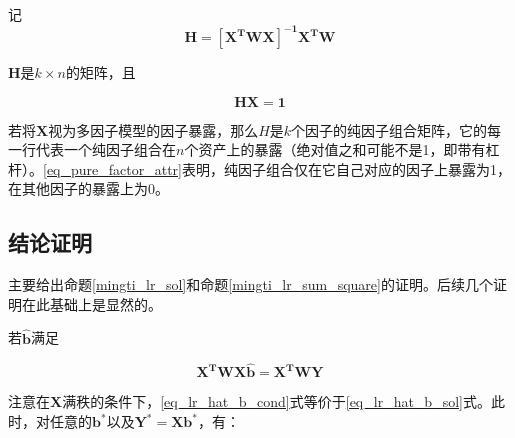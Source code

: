 \begin{mingti}
    记
    \begin{equation}
        \bm{H} = \bm{[X^TWX]^{-1}X^TW}
    \end{equation}

    $\bm{H}$是$k\times n$的矩阵，且

    \begin{equation}\label{eq_pure_factor_attr}
        \bm{HX} = \bm{1}
    \end{equation}

    若将$\bm{X}$视为多因子模型的因子暴露，那么$H$是$k$个因子的纯因子组合矩阵，它的每一行代表一个纯因子组合在$n$个资产上的暴露（绝对值之和可能不是1，即带有杠杆）。\ref{eq_pure_factor_attr}表明，纯因子组合仅在它自己对应的因子上暴露为1，在其他因子的暴露上为0。
\end{mingti}

\subsection{结论证明}

主要给出命题\ref{mingti_lr_sol}和命题\ref{mingti_lr_sum_square}的证明。后续几个证明在此基础上是显然的。

若$\bm{\hat{b}}$满足

\begin{equation}\label{eq_lr_hat_b_cond}
    \bm{X^TWX\hat{b}} = \bm{X^TWY}
\end{equation}

注意在$\bm{X}$满秩的条件下，\ref{eq_lr_hat_b_cond}式等价于\ref{eq_lr_hat_b_sol}式。此时，对任意的$\bm{b^*}$以及$\bm{Y^*}=\bm{Xb^*}$，有：

